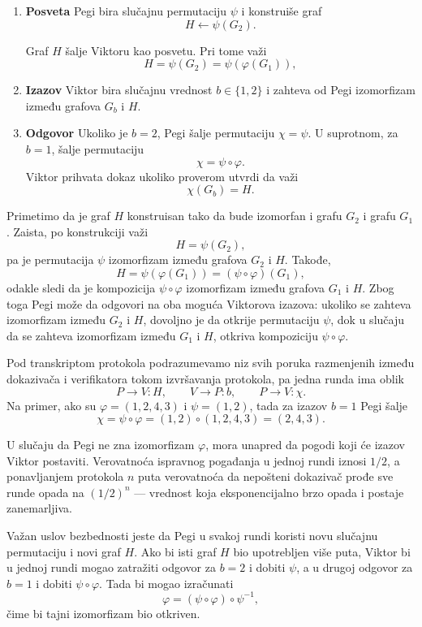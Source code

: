 \begin{enumerate}
  \item \textbf{Posveta}
  Pegi bira slučajnu permutaciju $\psi$ i konstruiše graf
  \[
    H \leftarrow \psi(G_2).
  \]

  Graf $H$ šalje Viktoru kao posvetu. Pri tome važi
  \[
    H=\psi(G_2)=\psi(\varphi(G_1)),
  \]

  \item \textbf{Izazov}
  Viktor bira slučajnu vrednost $b\in\{1,2\}$ i zahteva od Pegi izomorfizam između grafova $G_b$ i $H$.

  \item \textbf{Odgovor}
  Ukoliko je $b=2$, Pegi šalje permutaciju $\chi=\psi$. U suprotnom, za $b=1$, šalje permutaciju
  \[
    \chi=\psi\circ\varphi.
  \]
  Viktor prihvata dokaz ukoliko proverom utvrdi da važi
  \[
    \chi(G_b)=H.
  \]
\end{enumerate}

Primetimo da je graf $H$ konstruisan tako da bude izomorfan i grafu $G_2$ i
grafu $G_1$. Zaista, po konstrukciji važi
\[
H=\psi(G_2),
\]
pa je permutacija $\psi$ izomorfizam između grafova $G_2$ i $H$. Takođe,
\[
H=\psi(\varphi(G_1))=(\psi\circ\varphi)(G_1),
\]
odakle sledi da je kompozicija $\psi\circ\varphi$ izomorfizam između grafova
$G_1$ i $H$. Zbog toga Pegi može da odgovori na oba moguća Viktorova izazova:
ukoliko se zahteva izomorfizam između $G_2$ i $H$, dovoljno je da otkrije
permutaciju $\psi$, dok u slučaju da se zahteva izomorfizam između $G_1$ i $H$,
otkriva kompoziciju $\psi\circ\varphi$.

Pod transkriptom protokola podrazumevamo niz svih poruka razmenjenih između dokazivača i 
verifikatora tokom izvršavanja protokola, pa jedna runda ima oblik
\[
  P \to V : H,\qquad
  V \to P : b,\qquad
  P \to V : \chi.
\]
Na primer, ako su $\varphi=(1,2,4,3)$ i $\psi=(1,2)$, tada za izazov $b=1$
Pegi šalje
\[
  \chi=\psi\circ\varphi=(1,2)\circ(1,2,4,3)=(2,4,3).
\]

U slučaju da Pegi ne zna izomorfizam $\varphi$, mora unapred da pogodi koji će 
izazov Viktor postaviti. Verovatnoća ispravnog pogađanja u jednoj rundi 
iznosi $1/2$, a ponavljanjem protokola $n$ puta verovatnoća da nepošteni 
dokazivač prođe sve runde opada na $(1/2)^n$ — vrednost 
koja eksponencijalno brzo opada i postaje zanemarljiva.

Važan uslov bezbednosti jeste da Pegi u svakoj rundi koristi novu slučajnu
permutaciju i novi graf $H$. Ako bi isti graf $H$ bio upotrebljen više puta, Viktor
bi u jednoj rundi mogao zatražiti odgovor za $b=2$ i dobiti $\psi$, a u drugoj
odgovor za $b=1$ i dobiti $\psi\circ\varphi$. Tada bi mogao izračunati
\[
  \varphi = (\psi\circ\varphi)\circ\psi^{-1},
\]
čime bi tajni izomorfizam bio otkriven.

